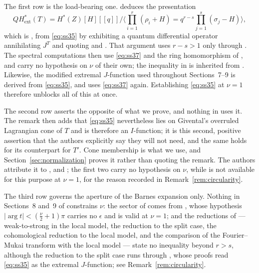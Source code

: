 The first row is the load-bearing one.  \cite[Theorem~4.6]{SS} deduces the
presentation
\begin{equation}
  \label{eq:ss37}
  QH^{*}_{\mathrm{ext}}(T)
  =H^{*}(Z)[H][[q]]\Big/\Big\langle\textstyle\prod_{i=1}^{r}(\rho_{i}+H)
    =q^{r-s}\prod_{j=1}^{s}(\sigma_{j}-H)\Big\rangle,
\end{equation}
which is \cite[(37)]{SS}, from \eqref{eq:ss35} by exhibiting a quantum
differential operator annihilating \(J^{T}\) and quoting
\cite[Theorem~10.3.1]{CoxKatz} and \cite[Lemma~2]{Pandharipande}.  That
argument uses \(r-s>1\) only through \cite[Theorem~4.4]{SS}.  The spectral
computations \cite[Propositions~5.1 and~5.2, Corollary~5.3]{SS} then use
\eqref{eq:ss37} and the ring homomorphism of \cite[Theorem~3.3]{SS}, and
carry no hypothesis on \(\nu\) of their own; the inequality in
\cite[Theorem~1.2]{SS} is inherited from \cite[Theorem~4.4]{SS}.  Likewise,
the modified extremal \(J\)-function \cite[(40)]{SS} used throughout
Sections~7--9 is derived from \eqref{eq:ss35}, and \cite[Proposition~9.1]{SS}
uses \eqref{eq:ss37} again.  Establishing \eqref{eq:ss35} at \(\nu=1\)
therefore unblocks all of this at once.

The second row asserts the opposite of what we prove, and nothing in
\cite{SS} uses it.  The remark then adds that \eqref{eq:ss35} nevertheless
lies on Givental's overruled Lagrangian cone of \(T\) and is therefore an
\(I\)-function; it is this second, positive assertion that the authors
explicitly say they will not need, and the same holds for its counterpart
\cite[Remark~4.7]{SS} for \(T'\).  Cone membership is what we use, and
Section~\ref{sec:normalization} proves it rather than quoting the remark.
The authors attribute it to \cite{Brown}, \cite{CoatesGivental} and
\cite[Lemma~9.6]{SS}; the first two carry no hypothesis on \(\nu\), while
\cite[Lemma~9.6]{SS} is not available for this purpose at \(\nu=1\), for the
reason recorded in Remark~\ref{rem:circularity}.

The third row governs the aperture of the Barnes expansion only.  Nothing in
Sections~8 and~9 of \cite{SS} constrains \(\nu\): the sector
\cite[(78)]{SS} of \cite[Proposition~8.2]{SS} comes from
\cite[Theorem~A.2]{SS}, whose hypothesis \(|\arg t|<(\tfrac{\nu}{2}+1)\pi\)
carries no \(\epsilon\) and is valid at \(\nu=1\); and the reductions of
\cite[Sections~9.1--9.4]{SS} --- weak-to-strong in the local model, the
reduction to the split case, the cohomological reduction to the local model,
and the comparison of the Fourier--Mukai transform with the local model ---
state no inequality beyond \(r>s\), although the reduction to the split case
runs through \cite[Lemmas~9.4--9.6]{SS}, whose proofs read \eqref{eq:ss35} as
the extremal \(J\)-function; see Remark~\ref{rem:circularity}.
